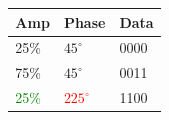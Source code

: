 \documentclass[]{beamer}
\begin{document}
\begin{frame}
\begin{columns}[T]
\begin{column}[T]{5cm}
        \end{column}
        \begin{column}[T]{5cm}
            \begin{table}[]
                \begin{tabular}{lll}
                    Amp  & Phase & Data \\
                    \hline
                    25\% & $45^{\circ}$  & 0000 \\
                    75\% & $45^{\circ}$  & 0011 \\
                    \textcolor{green}{25\%} & \textcolor{red}{$225^{\circ}$} & \textcolor{cyan!50}{1100} \\
                \end{tabular}
            \end{table}
        \end{column}
    \end{columns}
\end{frame}
\end{document}
